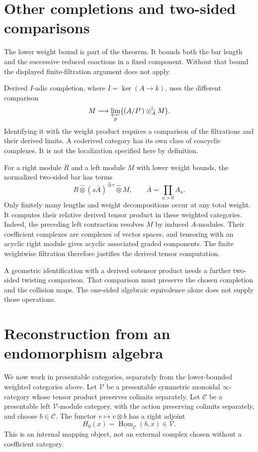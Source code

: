 \section{Other completions and two-sided comparisons}
The lower weight bound is part of the theorem.
It bounds both the bar length and the successive reduced coactions in a fixed component.
Without that bound the displayed finite-filtration argument does not apply.

Derived $I$-adic completion, where $I=\ker(A\to k)$, uses the different comparison
\[
 M\longrightarrow\varprojlim_p\bigl((A/I^p)\otimes_A^{\mathbb L}M\bigr).
\]
Identifying it with the weight product requires a comparison of the filtrations and their derived limits.
A coderived category has its own class of coacyclic complexes.
It is not the localization specified here by definition.

For a right module $R$ and a left module $M$ with lower weight bounds, the normalized two-sided bar has terms
\[
 R\widehat\otimes(s\bar A)^{\widehat\otimes r}\widehat\otimes M,
 \qquad \bar A=\prod_{u>0}A_u.
\]
Only finitely many lengths and weight decompositions occur at any total weight.
It computes their relative derived tensor product in these weighted categories.
Indeed, the preceding left contraction resolves $M$ by induced $A$-modules.
Their coefficient complexes are complexes of vector spaces, and tensoring with an acyclic right module gives acyclic associated graded components.
The finite weightwise filtration therefore justifies the derived tensor computation.

A geometric identification with a derived cotensor product needs a further two-sided twisting comparison.
That comparison must preserve the chosen completion and the collision maps.
The one-sided algebraic equivalence alone does not supply those operations.

\section{Reconstruction from an endomorphism algebra}
We now work in presentable categories, separately from the lower-bounded weighted categories above.
Let $\mathcal V$ be a presentable symmetric monoidal $\infty$-category whose tensor product preserves colimits separately.
Let $\mathcal C$ be a presentable left $\mathcal V$-module category, with the action preserving colimits separately, and choose $b\in\mathcal C$.
The functor $v\mapsto v\otimes b$ has a right adjoint
\[
 H_0(x)=\underline{\operatorname{Hom}}_{\mathcal C}(b,x)\in\mathcal V.
\]
This is an internal mapping object, not an external complex chosen without a coefficient category.


